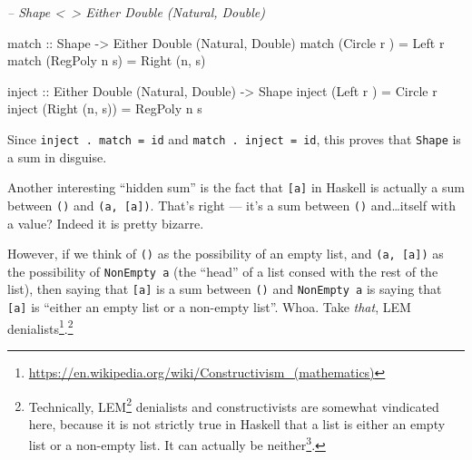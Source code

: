 \documentclass[]{article}
\newenvironment{Shaded}{}{}
\newcommand{\CommentTok}[1]{\textcolor[rgb]{0.38,0.63,0.69}{\textit{#1}}}
\newcommand{\DataTypeTok}[1]{\textcolor[rgb]{0.56,0.13,0.00}{#1}}
\newcommand{\FunctionTok}[1]{\textcolor[rgb]{0.02,0.16,0.49}{#1}}
\newcommand{\NormalTok}[1]{#1}
\newcommand{\OtherTok}[1]{\textcolor[rgb]{0.00,0.44,0.13}{#1}}
\renewcommand{\href}[2]{#2\footnote{\url{#1}}}
\begin{document}
\begin{Shaded}
\begin{Highlighting}[]
\CommentTok{-- Shape <~> Either Double (Natural, Double)}

\OtherTok{match ::} \DataTypeTok{Shape} \OtherTok{->} \DataTypeTok{Either} \DataTypeTok{Double}\NormalTok{ (}\DataTypeTok{Natural}\NormalTok{, }\DataTypeTok{Double}\NormalTok{)}
\NormalTok{match (}\DataTypeTok{Circle}\NormalTok{  r  ) }\FunctionTok{=} \DataTypeTok{Left}\NormalTok{ r}
\NormalTok{match (}\DataTypeTok{RegPoly}\NormalTok{ n s) }\FunctionTok{=} \DataTypeTok{Right}\NormalTok{ (n, s)}

\OtherTok{inject ::} \DataTypeTok{Either} \DataTypeTok{Double}\NormalTok{ (}\DataTypeTok{Natural}\NormalTok{, }\DataTypeTok{Double}\NormalTok{) }\OtherTok{->} \DataTypeTok{Shape}
\NormalTok{inject (}\DataTypeTok{Left}\NormalTok{   r    ) }\FunctionTok{=} \DataTypeTok{Circle}\NormalTok{  r}
\NormalTok{inject (}\DataTypeTok{Right}\NormalTok{ (n, s)) }\FunctionTok{=} \DataTypeTok{RegPoly}\NormalTok{ n s}
\end{Highlighting}
\end{Shaded}

Since \texttt{inject\ .\ match\ =\ id} and \texttt{match\ .\ inject\ =\ id},
this proves that \texttt{Shape} is a sum in disguise.

Another interesting ``hidden sum'' is the fact that \texttt{{[}a{]}} in Haskell
is actually a sum between \texttt{()} and \texttt{(a,\ {[}a{]})}. That's right
--- it's a sum between \texttt{()} and\ldots{}itself with a value? Indeed it is
pretty bizarre.

However, if we think of \texttt{()} as the possibility of an empty list, and
\texttt{(a,\ {[}a{]})} as the possibility of \texttt{NonEmpty\ a} (the ``head''
of a list consed with the rest of the list), then saying that \texttt{{[}a{]}}
is a sum between \texttt{()} and \texttt{NonEmpty\ a} is saying that
\texttt{{[}a{]}} is ``either an empty list or a non-empty list''. Whoa. Take
\emph{that},
\href{https://en.wikipedia.org/wiki/Constructivism_(mathematics)}{LEM
denialists}.\footnote{Technically,
  \href{https://en.wikipedia.org/wiki/Law_of_excluded_middle}{LEM} denialists
  and constructivists are somewhat vindicated here, because it is not strictly
  true in Haskell that a list is either an empty list or a non-empty list. It
  can actually \href{https://wiki.haskell.org/Bottom}{be neither}.}
\end{document}
